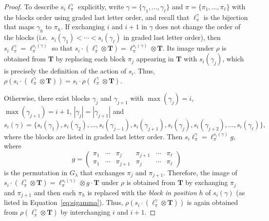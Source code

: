 \documentclass[10pt]{amsart}
\theoremstyle{definition}
\theoremstyle{remark}
\providecommand{\ie}{i.e.\ }
\begin{document}
\begin{proof}
To describe $s_i \ell_\pi^\gamma$ explicitly, write
$\gamma = \{\gamma_1, \ldots, \gamma_\ell\}$ and $\pi = \{\pi_1, \ldots, \pi_\ell\}$
with the blocks order using graded last letter order,
and recall that $\ell_\pi^\gamma$ is the bijection that maps $\gamma_h$ to $\pi_h$.
If exchanging $i$ and $i+1$ in $\gamma$ does not change the order of the
blocks (\ie $s_i(\gamma_1) < \cdots < s_i(\gamma_\ell)$ in
graded last letter order), then $s_i \ell_\pi^\gamma = \ell_\pi^{s_i(\gamma)}$
so that $s_i \cdot (\ell_\pi^\gamma \otimes \mathbf{T})
= \ell_\pi^{s_i(\gamma)} \otimes \mathbf{T}$.
Its image under $\rho$ is obtained from $\mathbf{T}$ by replacing each block
$\pi_j$ appearing in $\mathbf{T}$ with $s_i(\gamma_j)$,
which is precisely the definition of the action of $s_i$.
Thus, $\rho(s_i \cdot (\ell_\pi^\gamma \otimes \mathbf{T})) = s_i \cdot \rho(\ell_\pi^\gamma \otimes \mathbf{T})$.

Otherwise, there exist blocks $\gamma_{j}$ and $\gamma_{j+1}$ with
$\max(\gamma_{j}) = i$, $\max(\gamma_{j+1}) = i+1$,
$|\gamma_j| = |\gamma_{j+1}|$ and
\begin{equation} \label{eq:sigamma}
    s_i(\gamma) = \big\{
        s_i(\gamma_1), s_i(\gamma_2), \ldots,
        s_i(\gamma_{j-1}), s_i(\gamma_{j+1}), s_i(\gamma_{j}), s_i(\gamma_{j+2}), \ldots, s_i(\gamma_\ell)
        \big\},
\end{equation}
where the blocks are listed in graded last letter order.
Then $s_i \ell_\pi^\gamma = \ell_\pi^{s_i(\gamma)} g$, where
\[
g = \begin{pmatrix} \pi_1&\cdots&\pi_j&\pi_{j+1}&\cdots&\pi_{\ell}\\
\pi_1&\cdots&\pi_{j+1}&\pi_j&\cdots&\pi_{\ell}\end{pmatrix}
\]
is the permutation in $G_\lambda$ that exchanges $\pi_{j}$ and $\pi_{j+1}$.
Therefore, the image of
$s_i \cdot (\ell_\pi^\gamma \otimes \mathbf{T}) = \ell_\pi^{s_i(\gamma)} \otimes g \cdot \mathbf{T}$
under $\rho$ is obtained from $\mathbf{T}$ by exchanging $\pi_j$ and $\pi_{j+1}$
and then each $\pi_{h}$ is replaced with the \emph{block in position} $h$ of $s_i(\gamma)$
(as listed in Equation~\eqref{eq:sigamma}).
Thus, $\rho(s_i \cdot (\ell_\pi^\gamma \otimes \mathbf{T}))$ is
again obtained from $\rho(\ell_\pi^\gamma \otimes \mathbf{T})$
by interchanging $i$ and $i+1$.
\end{proof}
\end{document}
